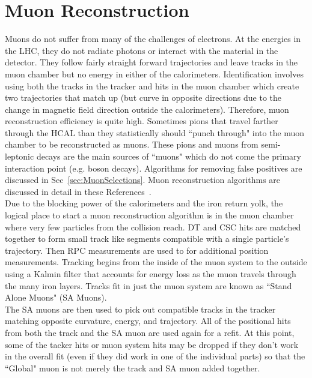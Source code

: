 	\section{Muon Reconstruction}
	Muons do not suffer from many of the challenges of electrons. At the energies in the LHC, they do not radiate photons or interact with the material in the detector. They follow fairly straight forward trajectories and leave tracks in the muon chamber but no energy in either of the calorimeters. Identification involves using both the tracks in the tracker and hits in the muon chamber which create two trajectories that match up (but curve in opposite directions due to the change in magnetic field direction outside the calorimeters). Therefore, muon reconstruction efficiency is quite high. Sometimes pions that travel farther through the HCAL than they statistically should ``punch through" into the muon chamber to be reconstructed as muons. These pions and muons from semi-leptonic decays are the main sources of ``muons" which do not come the primary interaction point (e.g. boson decays). Algorithms for removing false positives are discussed in Sec~\ref{sec:MuonSelections}. Muon reconstruction algorithms are discussed in detail in these References~\cite{muontdr,muonReco}.\\
	
	Due to the blocking power of the calorimeters and the iron return yolk, the logical place to start a muon reconstruction algorithm is in the muon chamber where very few particles from the collision reach. DT and CSC hits are matched together to form small track like segments compatible with a single particle's trajectory. Then RPC measurements are used to for additional position measurements. Tracking begins from the inside of the muon system to the outside using a Kalmin filter that accounts for energy loss as the muon travels through the many iron layers. Tracks fit in just the muon system are known as ``Stand Alone Muons" (SA Muons).\\
	
	The SA muons are then used to pick out compatible tracks in the tracker matching opposite curvature, energy, and trajectory. All of the positional hits from both the track and the SA muon are used again for a refit. At this point, some of the tacker hits or muon system hits may be dropped if they don't work in the overall fit (even if they did work in one of the individual parts) so that the ``Global" muon is not merely the track and SA muon added together.\\
	
